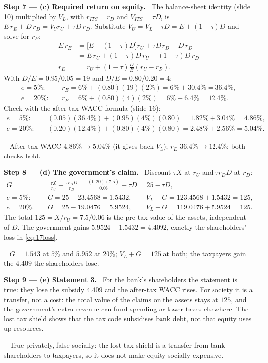 \documentclass[11pt,a4paper]{article}
\numberwithin{equation}{section}
\newcommand{\step}[2]{\par\smallskip\noindent\textbf{Step #1 --- #2.}~}
\newcommand{\answer}[1]{\par\smallskip\noindent\fbox{\textbf{Answer #1.}}~}
\begin{document}
\step{7}{(c) Required return on equity} The balance-sheet identity (slide 10) multiplied by $V_L$, with
$r_{ITS}=r_D$ and $V_{ITS}=\tau D$, is $E\,r_E+D\,r_D=V_U r_U+\tau D\,r_D$. Substitute $V_U=V_L-\tau D=E+(1-\tau)D$ and solve for $r_E$:
\begin{align}
  E\,r_E &= \bigl[E+(1-\tau)D\bigr]r_U+\tau D\,r_D-D\,r_D \nonumber\\
         &= E\,r_U+(1-\tau)D\,r_U-(1-\tau)D\,r_D \nonumber\\
  r_E &= r_U+(1-\tau)\frac{D}{E}(r_U-r_D). \label{eq:17rE}
\end{align}
With $D/E=0.95/0.05=19$ and $D/E=0.80/0.20=4$:
\begin{align}
  e=5\%:&\quad r_E=6\%+(0.80)(19)(2\%)=6\%+30.4\%=36.4\%, \nonumber\\
  e=20\%:&\quad r_E=6\%+(0.80)(4)(2\%)=6\%+6.4\%=12.4\%. \nonumber
\end{align}
Check with the after-tax WACC formula (slide 16):
\begin{align}
  e=5\%:&\quad (0.05)(36.4\%)+(0.95)(4\%)(0.80)=1.82\%+3.04\%=4.86\%, \nonumber\\
  e=20\%:&\quad (0.20)(12.4\%)+(0.80)(4\%)(0.80)=2.48\%+2.56\%=5.04\%. \nonumber
\end{align}
\answer{(c)} After-tax WACC $4.86\%\to5.04\%$ (it gives back $V_L$); $r_E$ $36.4\%\to12.4\%$; both
checks hold.

\step{8}{(d) The government's claim} Discount $\tau X$ at $r_U$ and $\tau r_D D$ at $r_D$:
\begin{align}
  G &= \frac{\tau X}{r_U}-\frac{\tau r_D D}{r_D}=\frac{(0.20)(7.5)}{0.06}-\tau D=25-\tau D, \label{eq:17G}\\
  e=5\%:&\quad G=25-23.4568=1.5432,\qquad V_L+G=123.4568+1.5432=125, \nonumber\\
  e=20\%:&\quad G=25-19.0476=5.9524,\qquad V_L+G=119.0476+5.9524=125. \nonumber
\end{align}
The total $125=X/r_U=7.5/0.06$ is the pre-tax value of the assets, independent of $D$. The government
gains $5.9524-1.5432=4.4092$, exactly the shareholders' loss in \eqref{eq:17loss}.
\answer{(d)} $G=1.543$ at $5\%$ and $5.952$ at $20\%$; $V_L+G=125$ at both; the taxpayers gain the
$4.409$ the shareholders lose.

\step{9}{(e) Statement 3} For the bank's shareholders the statement is true: they lose the subsidy
$4.409$ and the after-tax WACC rises. For society it is a transfer, not a cost: the total value of the
claims on the assets stays at $125$, and the government's extra revenue can fund spending or lower
taxes elsewhere. The lost tax shield shows that the tax code subsidises bank debt, not that equity
uses up resources.
\answer{(e)} True privately, false socially: the lost tax shield is a transfer from bank shareholders to
taxpayers, so it does not make equity socially expensive.
\end{document}
